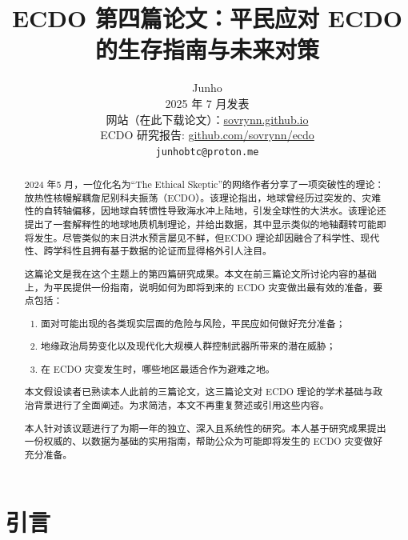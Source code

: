 \documentclass[10pt,twocolumn,letterpaper]{article}
\begin{document}
\title{ECDO 第四篇论文：平民应对 ECDO 的生存指南与未来对策}

\author{Junho\\
2025 年 7 月发表\\
网站（在此下载论文）：\href{https://sovrynn.github.io}{sovrynn.github.io}\\
ECDO 研究报告: \href{https://github.com/sovrynn/ecdo}{github.com/sovrynn/ecdo}\\
{\tt\small junhobtc@proton.me}
}

\maketitle

\begin{abstract}
2024 年5 月，一位化名为“The Ethical Skeptic”的网络作者\cite{0}分享了一项突破性的理论：放热性核幔解耦詹尼别科夫振荡（ECDO）\cite{1}。该理论指出，地球曾经历过突发的、灾难性的自转轴偏移，因地球自转惯性导致海水冲上陆地，引发全球性的大洪水。该理论还提出了一套解释性的地球地质机制理论，并给出数据，其中显示类似的地轴翻转可能即将发生。尽管类似的末日洪水预言屡见不鲜，但ECDO 理论却因融合了科学性、现代性、跨学科性且拥有基于数据的论证而显得格外引人注目。

这篇论文是我在这个主题上的第四篇研究成果\cite{2,3}。本文在前三篇论文所讨论内容的基础上，为平民提供一份指南，说明如何为即将到来的 ECDO 灾变做出最有效的准备，要点包括：
\begin{flushleft}
\begin{enumerate}
    \item 面对可能出现的各类现实层面的危险与风险，平民应如何做好充分准备；
    \item 地缘政治局势变化以及现代化大规模人群控制武器所带来的潜在威胁；
    \item 在 ECDO 灾变发生时，哪些地区最适合作为避难之地。
\end{enumerate}
\end{flushleft}
本文假设读者已熟读本人此前的三篇论文\cite{3}，这三篇论文对 ECDO 理论的学术基础与政治背景进行了全面阐述。为求简洁，本文不再重复赘述或引用这些内容。

本人针对该议题进行了为期一年的独立、深入且系统性的研究。本人基于研究成果提出一份权威的、以数据为基础的实用指南，帮助公众为可能即将发生的 ECDO 灾变做好充分准备。
\end{abstract}
\section{引言}
\end{document}
